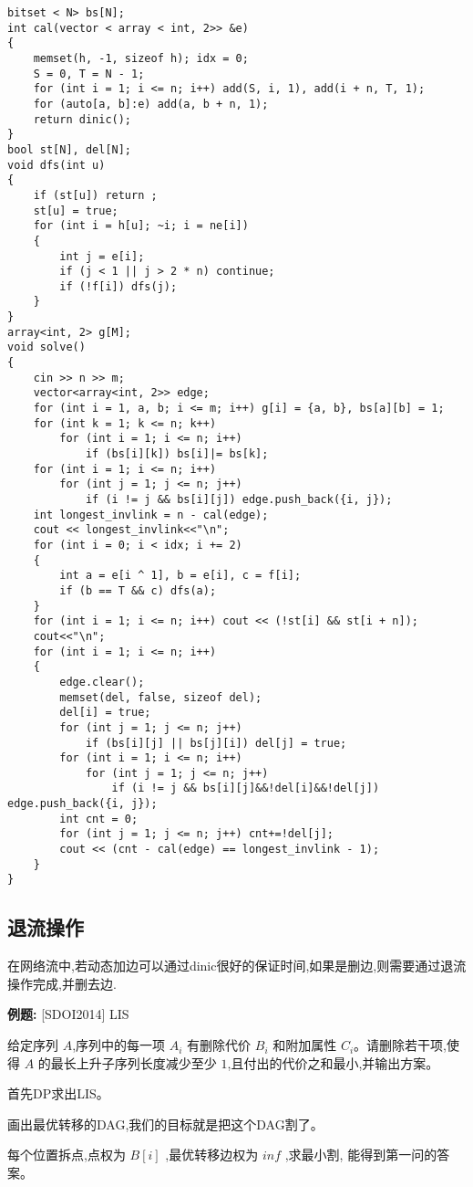 \documentclass[a4paper,fontset=none]{ctexart}
\begin{document}
\begin{verbatim}
bitset < N> bs[N];
int cal(vector < array < int, 2>> &e)
{
    memset(h, -1, sizeof h); idx = 0;
    S = 0, T = N - 1;
    for (int i = 1; i <= n; i++) add(S, i, 1), add(i + n, T, 1);
    for (auto[a, b]:e) add(a, b + n, 1);
    return dinic();
}
bool st[N], del[N];
void dfs(int u)
{
    if (st[u]) return ;
    st[u] = true;
    for (int i = h[u]; ~i; i = ne[i])
    {
        int j = e[i];
        if (j < 1 || j > 2 * n) continue;
        if (!f[i]) dfs(j);
    }
}
array<int, 2> g[M];
void solve()
{
    cin >> n >> m;
    vector<array<int, 2>> edge;
    for (int i = 1, a, b; i <= m; i++) g[i] = {a, b}, bs[a][b] = 1;
    for (int k = 1; k <= n; k++)
        for (int i = 1; i <= n; i++)
            if (bs[i][k]) bs[i]|= bs[k];
    for (int i = 1; i <= n; i++)
        for (int j = 1; j <= n; j++)
            if (i != j && bs[i][j]) edge.push_back({i, j});
    int longest_invlink = n - cal(edge);
    cout << longest_invlink<<"\n";
    for (int i = 0; i < idx; i += 2)
    {
        int a = e[i ^ 1], b = e[i], c = f[i];
        if (b == T && c) dfs(a);
    }
    for (int i = 1; i <= n; i++) cout << (!st[i] && st[i + n]);
    cout<<"\n";
    for (int i = 1; i <= n; i++)
    {
        edge.clear();
        memset(del, false, sizeof del);
        del[i] = true;
        for (int j = 1; j <= n; j++)
            if (bs[i][j] || bs[j][i]) del[j] = true;
        for (int i = 1; i <= n; i++)
            for (int j = 1; j <= n; j++)
                if (i != j && bs[i][j]&&!del[i]&&!del[j]) edge.push_back({i, j});
        int cnt = 0;
        for (int j = 1; j <= n; j++) cnt+=!del[j];
        cout << (cnt - cal(edge) == longest_invlink - 1);
    }
}
\end{verbatim}
\subsection{退流操作}

在网络流中,若动态加边可以通过dinic很好的保证时间,如果是删边,则需要通过退流操作完成,并删去边.

\textbf{例题:}
[SDOI2014] LIS

给定序列 $A$,序列中的每一项 $A_i$ 有删除代价 $B_i$ 和附加属性 $C_i$。请删除若干项,使得 $A$ 的最长上升子序列长度减少至少 $1$,且付出的代价之和最小,并输出方案。

首先DP求出LIS。

画出最优转移的DAG,我们的目标就是把这个DAG割了。

每个位置拆点,点权为 $B[i]$ ,最优转移边权为 $inf$ ,求最小割, 能得到第一问的答案。
\end{document}
